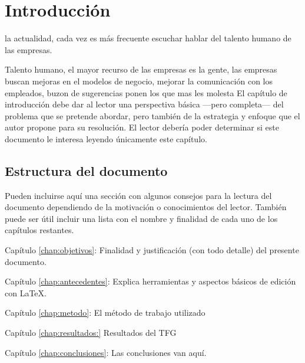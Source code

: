 \chapter{Introducción}

 la actualidad, cada vez es más frecuente escuchar hablar del talento humano de las empresas. 


Talento humano, el mayor recurso de las empresas es la gente, 
las empresas buscan mejoras en el modelos de negocio, mejorar la comunicación con los empleados, buzon de sugerencias ponen los que mas les molesta
El capítulo de introducción debe dar al lector una perspectiva básica ---pero
completa--- del problema que se pretende abordar, pero también de la estrategia
y enfoque que el autor propone para su resolución. El lector debería poder
determinar si este documento le interesa leyendo únicamente este capítulo.


\section{Estructura del documento}

Pueden incluirse aquí una sección con algunos consejos para la lectura del
documento dependiendo de la motivación o conocimientos del lector.  También
puede ser útil incluir una lista con el nombre y finalidad de cada uno de los
capítulos restantes.

\begin{definitionlist}
\item[Capítulo \ref{chap:objetivos}: \nameref{chap:objetivos}] Finalidad y justificación
  (con todo detalle) del presente documento.
 \item[Capítulo \ref{chap:antecedentes}: \nameref{chap:antecedentes}] Explica herramientas
  y aspectos básicos de edición con \LaTeX.
  \item [Capítulo \ref{chap:metodo}: \nameref{chap:metodo}] El método de trabajo utilizado
  \item[Capítulo \ref{chap:resultados:} \nameref{chap:resultado}] Resultados del TFG
  \item[Capítulo \ref{chap:conclusiones}: \nameref{chap:conclusiones}] Las conclusiones van aquí.
\end{definitionlist}

